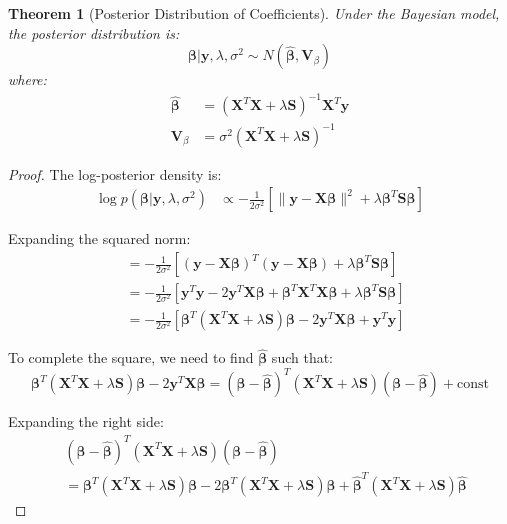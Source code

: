 \documentclass[12pt]{article}
\newtheorem{theorem}{Theorem}
\begin{document}
\begin{theorem}[Posterior Distribution of Coefficients]
Under the Bayesian model, the posterior distribution is:
\begin{equation}
\bm{\beta} | \mathbf{y}, \lambda, \sigma^2 \sim N(\hat{\bm{\beta}}, \mathbf{V}_\beta)
\end{equation}
where:
\begin{align}
\hat{\bm{\beta}} &= (\mathbf{X}^T\mathbf{X} + \lambda\mathbf{S})^{-1}\mathbf{X}^T\mathbf{y} \\
\mathbf{V}_\beta &= \sigma^2(\mathbf{X}^T\mathbf{X} + \lambda\mathbf{S})^{-1}
\end{align}
\end{theorem}

\begin{proof}
The log-posterior density is:
\begin{align}
\log p(\bm{\beta}|\mathbf{y}, \lambda, \sigma^2) &\propto -\frac{1}{2\sigma^2}\left[\|\mathbf{y} - \mathbf{X}\bm{\beta}\|^2 + \lambda\bm{\beta}^T\mathbf{S}\bm{\beta}\right]
\end{align}

Expanding the squared norm:
\begin{align}
&= -\frac{1}{2\sigma^2}\left[(\mathbf{y} - \mathbf{X}\bm{\beta})^T(\mathbf{y} - \mathbf{X}\bm{\beta}) + \lambda\bm{\beta}^T\mathbf{S}\bm{\beta}\right] \\
&= -\frac{1}{2\sigma^2}\left[\mathbf{y}^T\mathbf{y} - 2\mathbf{y}^T\mathbf{X}\bm{\beta} + \bm{\beta}^T\mathbf{X}^T\mathbf{X}\bm{\beta} + \lambda\bm{\beta}^T\mathbf{S}\bm{\beta}\right] \\
&= -\frac{1}{2\sigma^2}\left[\bm{\beta}^T(\mathbf{X}^T\mathbf{X} + \lambda\mathbf{S})\bm{\beta} - 2\mathbf{y}^T\mathbf{X}\bm{\beta} + \mathbf{y}^T\mathbf{y}\right]
\end{align}

To complete the square, we need to find $\hat{\bm{\beta}}$ such that:
\begin{equation}
\bm{\beta}^T(\mathbf{X}^T\mathbf{X} + \lambda\mathbf{S})\bm{\beta} - 2\mathbf{y}^T\mathbf{X}\bm{\beta} = (\bm{\beta} - \hat{\bm{\beta}})^T(\mathbf{X}^T\mathbf{X} + \lambda\mathbf{S})(\bm{\beta} - \hat{\bm{\beta}}) + \text{const}
\end{equation}

Expanding the right side:
\begin{align}
&(\bm{\beta} - \hat{\bm{\beta}})^T(\mathbf{X}^T\mathbf{X} + \lambda\mathbf{S})(\bm{\beta} - \hat{\bm{\beta}}) \\
&= \bm{\beta}^T(\mathbf{X}^T\mathbf{X} + \lambda\mathbf{S})\bm{\beta} - 2\bm{\beta}^T(\mathbf{X}^T\mathbf{X} + \lambda\mathbf{S})\hat{\bm{\beta}} + \hat{\bm{\beta}}^T(\mathbf{X}^T\mathbf{X} + \lambda\mathbf{S})\hat{\bm{\beta}}
\end{align}


\end{proof}
\end{document}
